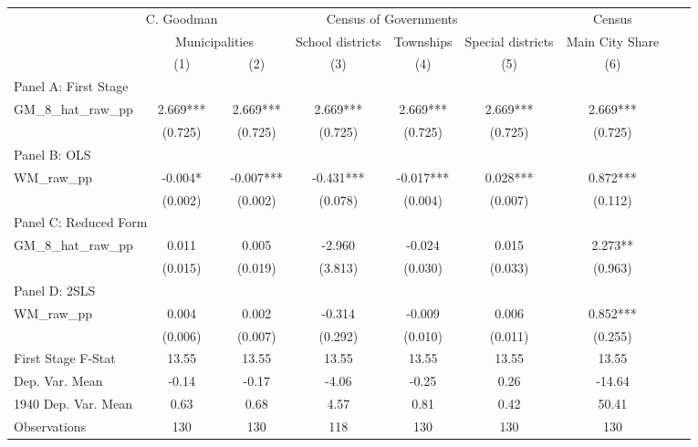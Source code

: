  \begin{tabular}{l*{8}{c}} \toprule
&\multicolumn{1}{c}{C. Goodman}&\multicolumn{4}{c}{Census of Governments}&\multicolumn{1}{c}{Census}\\\cmidrule(lr){2-2}\cmidrule(lr){3-6}\cmidrule(lr){7-7}
&\multicolumn{2}{c}{Municipalities}&\multicolumn{1}{c}{School districts}&\multicolumn{1}{c}{Townships}&\multicolumn{1}{c}{Special districts}&\multicolumn{1}{c}{Main City Share}\\\cmidrule(lr){2-3}\cmidrule(lr){4-6}\cmidrule(lr){7-7}
&\multicolumn{1}{c}{(1)}&\multicolumn{1}{c}{(2)}&\multicolumn{1}{c}{(3)}&\multicolumn{1}{c}{(4)}&\multicolumn{1}{c}{(5)}&\multicolumn{1}{c}{(6)}\\
\cmidrule(lr){1-7}
\multicolumn{6}{l}{Panel A: First Stage}\\
\cmidrule(lr){1-7}
GM\_8\_hat\_raw\_pp &    2.669***&    2.669***&    2.669***&    2.669***&    2.669***&    2.669***\\
                &  (0.725)   &  (0.725)   &  (0.725)   &  (0.725)   &  (0.725)   &  (0.725)   \\
\cmidrule(lr){1-7}
\multicolumn{6}{l}{Panel B: OLS}\\
\cmidrule(lr){1-7}
WM\_raw\_pp       &   -0.004*  &   -0.007***&   -0.431***&   -0.017***&    0.028***&    0.872***\\
                &  (0.002)   &  (0.002)   &  (0.078)   &  (0.004)   &  (0.007)   &  (0.112)   \\
\cmidrule(lr){1-7}
\multicolumn{6}{l}{Panel C: Reduced Form}\\
\cmidrule(lr){1-7}
GM\_8\_hat\_raw\_pp &    0.011   &    0.005   &   -2.960   &   -0.024   &    0.015   &    2.273** \\
                &  (0.015)   &  (0.019)   &  (3.813)   &  (0.030)   &  (0.033)   &  (0.963)   \\
\cmidrule(lr){1-7}
\multicolumn{6}{l}{Panel D: 2SLS}\\
\cmidrule(lr){1-7}
WM\_raw\_pp       &    0.004   &    0.002   &   -0.314   &   -0.009   &    0.006   &    0.852***\\
                &  (0.006)   &  (0.007)   &  (0.292)   &  (0.010)   &  (0.011)   &  (0.255)   \\
\midrule
First Stage F-Stat&    13.55   &    13.55   &    13.55   &    13.55   &    13.55   &    13.55   \\
Dep. Var. Mean  &    -0.14   &    -0.17   &    -4.06   &    -0.25   &     0.26   &   -14.64   \\
1940 Dep. Var. Mean&     0.63   &     0.68   &     4.57   &     0.81   &     0.42   &    50.41   \\
Observations    &      130   &      130   &      118   &      130   &      130   &      130   \\
       \bottomrule \end{tabular}
